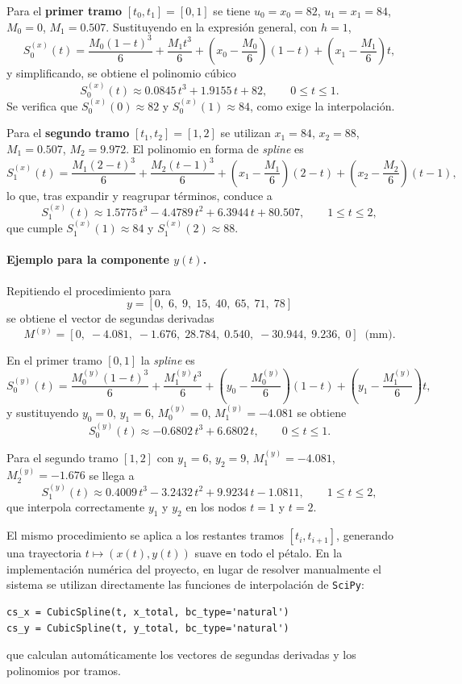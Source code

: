 \documentclass[11pt,a4paper]{article}
\begin{document}
Para el \textbf{primer tramo} $[t_0,t_1]=[0,1]$ se tiene $u_0=x_0=82$, $u_1=x_1=84$, $M_0=0$, $M_1=0.507$.  
Sustituyendo en la expresión general, con $h=1$,
\[
S_0^{(x)}(t) =
\frac{M_0 (1-t)^3}{6}
+\frac{M_1 t^3}{6}
+\left(x_0-\frac{M_0}{6}\right)(1-t)
+\left(x_1-\frac{M_1}{6}\right)t,
\]
y simplificando, se obtiene el polinomio cúbico
\[
S_0^{(x)}(t) \approx
0.0845\,t^3 + 1.9155\,t + 82,
\qquad 0 \le t \le 1.
\]
Se verifica que $S_0^{(x)}(0) \approx 82$ y $S_0^{(x)}(1) \approx 84$, como exige la interpolación.

Para el \textbf{segundo tramo} $[t_1,t_2]=[1,2]$ se utilizan $x_1=84$, $x_2=88$, $M_1=0.507$, $M_2=9.972$.  
El polinomio en forma de \emph{spline} es
\[
S_1^{(x)}(t) =
\frac{M_1 (2-t)^3}{6}
+\frac{M_2 (t-1)^3}{6}
+\left(x_1-\frac{M_1}{6}\right)(2-t)
+\left(x_2-\frac{M_2}{6}\right)(t-1),
\]
lo que, tras expandir y reagrupar términos, conduce a
\[
S_1^{(x)}(t) \approx
1.5775\,t^3 - 4.4789\,t^2 + 6.3944\,t + 80.507,
\qquad 1 \le t \le 2,
\]
que cumple $S_1^{(x)}(1)\approx 84$ y $S_1^{(x)}(2)\approx 88$.

\paragraph{Ejemplo para la componente $y(t)$.}
Repitiendo el procedimiento para
\[
y = [0,\;6,\;9,\;15,\;40,\;65,\;71,\;78]
\]
se obtiene el vector de segundas derivadas
\[
M^{(y)} =
[0,\;-4.081,\;-1.676,\;28.784,\;0.540,\;-30.944,\;9.236,\;0]\;\;\text{(mm)}.
\]

En el primer tramo $[0,1]$ la \emph{spline} es
\[
S_0^{(y)}(t) =
\frac{M^{(y)}_0 (1-t)^3}{6}
+\frac{M^{(y)}_1 t^3}{6}
+\left(y_0-\frac{M^{(y)}_0}{6}\right)(1-t)
+\left(y_1-\frac{M^{(y)}_1}{6}\right)t,
\]
y sustituyendo $y_0=0$, $y_1=6$, $M^{(y)}_0=0$, $M^{(y)}_1=-4.081$ se obtiene
\[
S_0^{(y)}(t) \approx
-0.6802\,t^3 + 6.6802\,t,
\qquad 0 \le t \le 1.
\]

Para el segundo tramo $[1,2]$ con $y_1=6$, $y_2=9$, $M^{(y)}_1=-4.081$, $M^{(y)}_2=-1.676$ se llega a
\[
S_1^{(y)}(t) \approx
0.4009\,t^3 - 3.2432\,t^2 + 9.9234\,t - 1.0811,
\qquad 1 \le t \le 2,
\]
que interpola correctamente $y_1$ y $y_2$ en los nodos $t=1$ y $t=2$.

El mismo procedimiento se aplica a los restantes tramos $[t_i,t_{i+1}]$, generando una trayectoria $t\mapsto (x(t),y(t))$ suave en todo el pétalo.  
En la implementación numérica del proyecto, en lugar de resolver manualmente el sistema se utilizan directamente las funciones de interpolación de \texttt{SciPy}:
\begin{verbatim}
cs_x = CubicSpline(t, x_total, bc_type='natural')
cs_y = CubicSpline(t, y_total, bc_type='natural')
\end{verbatim}
que calculan automáticamente los vectores de segundas derivadas y los polinomios por tramos.
\end{document}
